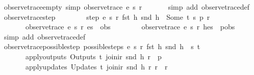 \begin{isabellebody}
\ observe{\isacharunderscore}trace{\isacharunderscore}empty\ {\isacharbrackleft}simp{\isacharbrackright}{\isacharcolon}\ {\isachardoublequoteopen}observe{\isacharunderscore}trace\ e\ s\ r\ {\isacharbrackleft}{\isacharbrackright}\ {\isacharequal}\ {\isacharbrackleft}{\isacharbrackright}{\isachardoublequoteclose}\isanewline
%
\isadelimproof
\ \ %
\endisadelimproof
%
\isatagproof
{}\isamarkupfalse%
\ {\isacharparenleft}simp\ add{\isacharcolon}\ observe{\isacharunderscore}trace{\isacharunderscore}def{\isacharparenright}%
\endisatagproof
{\isafoldproof}%
%
\isadelimproof
\isanewline
%
\endisadelimproof
\isanewline
{}\isamarkupfalse%
\ observe{\isacharunderscore}trace{\isacharunderscore}step{\isacharcolon}\ {\isachardoublequoteopen}\isanewline
\ \ \ \ \ \ \ step\ e\ s\ r\ {\isacharparenleft}fst\ h{\isacharparenright}\ {\isacharparenleft}snd\ h{\isacharparenright}\ {\isacharequal}\ Some\ {\isacharparenleft}t{\isacharcomma}\ s{\isacharprime}{\isacharcomma}\ p{\isacharcomma}\ r{\isacharprime}{\isacharparenright}\ {\isasymLongrightarrow}\isanewline
\ \ \ \ \ \ \ observe{\isacharunderscore}trace\ e\ s{\isacharprime}\ r{\isacharprime}\ es\ {\isacharequal}\ obs\ {\isasymLongrightarrow}\isanewline
\ \ \ \ \ \ \ observe{\isacharunderscore}trace\ e\ s\ r\ {\isacharparenleft}h{\isacharhash}es{\isacharparenright}\ {\isacharequal}\ p{\isacharhash}obs{\isachardoublequoteclose}\isanewline
%
\isadelimproof
\ \ %
\endisadelimproof
%
\isatagproof
{}\isamarkupfalse%
\ {\isacharparenleft}simp\ add{\isacharcolon}\ observe{\isacharunderscore}trace{\isacharunderscore}def{\isacharparenright}%
\endisatagproof
{\isafoldproof}%
%
\isadelimproof
\isanewline
%
\endisadelimproof
\isanewline
{}\isamarkupfalse%
\ observe{\isacharunderscore}trace{\isacharunderscore}possible{\isacharunderscore}step{\isacharcolon}\ {\isachardoublequoteopen}possible{\isacharunderscore}steps\ e\ s\ r\ {\isacharparenleft}fst\ h{\isacharparenright}\ {\isacharparenleft}snd\ h{\isacharparenright}\ {\isacharequal}\ {\isacharbraceleft}{\isacharbar}{\isacharparenleft}s{\isacharprime}{\isacharcomma}\ t{\isacharparenright}{\isacharbar}{\isacharbraceright}\ {\isasymLongrightarrow}\isanewline
\ \ \ \ \ \ \ apply{\isacharunderscore}outputs\ {\isacharparenleft}Outputs\ t{\isacharparenright}\ {\isacharparenleft}join{\isacharunderscore}ir\ {\isacharparenleft}snd\ h{\isacharparenright}\ r{\isacharparenright}\ {\isacharequal}\ p\ {\isasymLongrightarrow}\isanewline
\ \ \ \ \ \ \ apply{\isacharunderscore}updates\ {\isacharparenleft}Updates\ t{\isacharparenright}\ {\isacharparenleft}join{\isacharunderscore}ir\ {\isacharparenleft}snd\ h{\isacharparenright}\ r{\isacharparenright}\ r\ {\isacharequal}\ r{\isacharprime}\ {\isasymLongrightarrow}\isanewline

\end{isabellebody}
